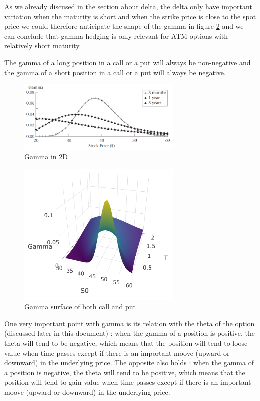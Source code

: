 \documentclass[hidelinks]{article}
\begin{document}
	As we already discused in the section about delta, the delta only have important variation when the maturity is short and when the strike price is close to the spot price we could therefore anticipate the shape of the gamma in figure \ref{fig:gamma} and we can conclude that gamma hedging is only relevant for ATM options with relatively short maturity. 
	
	The gamma of a long position in a call or a put will always be non-negative and the gamma of a short position in a call or a put will always be negative.
	
	\begin{figure}[!h]
	\centering
	
	\includegraphics[width=0.7\textwidth]{gamma_2d.png}
	
	\caption{Gamma in 2D}
	\label{fig:gamma2d}
	\end{figure}
	
	\begin{figure}[!h]
	\centering
	\includegraphics[width=0.7\textwidth]{gamma_call.png}
    \caption{Gamma surface of both call and put}
    \label{fig:gamma}
    \end{figure}
    
    One very important point with gamma is its relation with the theta of the option (discussed later in this document) : when the gamma of a position is positive, the theta will tend to be negative, which means that the position will tend to loose value when time passes except if there is an important moove (upward or downward) in the underlying price. The opposite also holds : when the gamma of a position is negative, the theta will tend to be positive, which means that the position will tend to gain value when time passes except if there is an important moove (upward or downward) in the underlying price.
    
\end{document}
